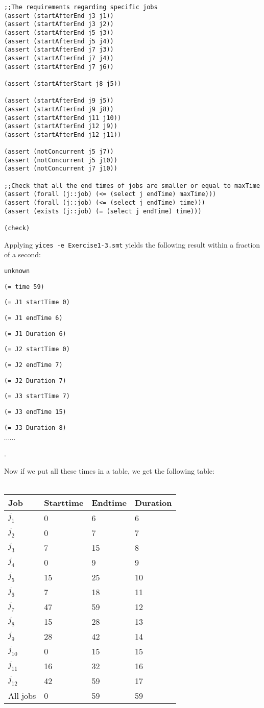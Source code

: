 \documentclass[12pt]{article}
\begin{document}
{\begin{verbatim}
;;The requirements regarding specific jobs
(assert (startAfterEnd j3 j1))
(assert (startAfterEnd j3 j2))
(assert (startAfterEnd j5 j3))
(assert (startAfterEnd j5 j4))
(assert (startAfterEnd j7 j3))
(assert (startAfterEnd j7 j4))
(assert (startAfterEnd j7 j6))

(assert (startAfterStart j8 j5))

(assert (startAfterEnd j9 j5))
(assert (startAfterEnd j9 j8))
(assert (startAfterEnd j11 j10))
(assert (startAfterEnd j12 j9))
(assert (startAfterEnd j12 j11))

(assert (notConcurrent j5 j7))
(assert (notConcurrent j5 j10))
(assert (notConcurrent j7 j10))

;;Check that all the end times of jobs are smaller or equal to maxTime
(assert (forall (j::job) (<= (select j endTime) maxTime)))
(assert (forall (j::job) (<= (select j endTime) time)))
(assert (exists (j::job) (= (select j endTime) time)))

(check)
\end{verbatim}
}

\noindent Applying {\tt yices -e Exercise1-3.smt} yields the following result
within a fraction of a second:

{\footnotesize

{\tt unknown}

{\tt (= time 59)}

{\tt (= J1 startTime 0)}

{\tt (= J1 endTime 6)}

{\tt (= J1 Duration 6)}

{\tt (= J2 startTime 0)}

{\tt (= J2 endTime 7)}

{\tt (= J2 Duration 7)}

{\tt (= J3 startTime 7)}

{\tt (= J3 endTime 15)}

{\tt (= J3 Duration 8)}

$\cdots \cdots$ }.

\noindent Now if we put all these times in a table, we get the following table:\\
\\
\begin{tabular}{| l | l | l | l |}
\hline
Job	& Starttime	& Endtime	& Duration\\
\hline
$j_1$	& 0	&	6	&	6\\
$j_2$	& 0	&	7	&	7\\
$j_3$	& 7	&	15	&	8\\
$j_4$	& 0	&	9	&	9\\
$j_5$	& 15	&	25	&	10\\
$j_6$	& 7	&	18	&	11\\
$j_7$	& 47	&	59	&	12\\
$j_8$	& 15	&	28	&	13\\
$j_9$	& 28	&	42	&	14\\
$j_{10}$	& 0	&	15	&	15\\
$j_{11}$	& 16	&	32	&	16\\
$j_{12}$	& 42	&	59	&	17\\
\hline
All jobs	&	0	&	59	&	59\\
\hline
\end{tabular}
\end{document}
